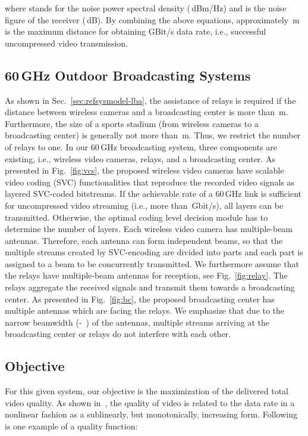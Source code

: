 \documentclass[conference]{IEEEtran}
\begin{document}
where  stands for the noise power spectral density (\,dBm/Hz) and  is the noise figure of the receiver (\,dB).
By combining the above equations, approximately \,m is the maximum distance for obtaining  GBit/s data rate, i.e., successful uncompressed video transmission.






\subsection{60\,GHz Outdoor Broadcasting Systems}\label{sec:refsysmodel-model}


As shown in Sec.~\ref{sec:refsysmodel-lba}, the assistance of relays is required if the distance between wireless cameras and a broadcasting center is more than \,m.
Furthermore, the size of a sports stadium (from wireless cameras to a broadcasting center) is generally not more than \,m. Thus, we restrict the number of relays to one.
In our 60\,GHz broadcasting system, three components are existing, i.e., wireless video cameras, relays, and a broadcasting center.
As presented in Fig.~\ref{fig:vcs}, the proposed wireless video cameras have scalable video coding (SVC) functionalities that reproduce the recorded video signals as layered SVC-coded bitstreams.
If the achievable rate of a 60\,GHz link is sufficient for uncompressed video streaming (i.e., more than \,Gbit/s), all layers can be transmitted.
Otherwise, the optimal coding level decision module has to determine the number of layers.
Each wireless video camera has multiple-beam antennas.
Therefore, each antenna can form  independent beams, so that the multiple streams created by SVC-encoding are divided into  parts and each part is assigned to a beam to be concurrently transmitted.
We furthermore assume that the relays have multiple-beam antennas for reception, see
Fig.~\ref{fig:relay}. The relays aggregate the received signals and transmit them towards a broadcasting center. As presented in Fig.~\ref{fig:bc}, the proposed broadcasting center has multiple antennas which are facing the relays. We emphasize that due to the narrow beamwidth (-~\cite{comotech}) of the antennas, multiple streams arriving at the broadcasting center or relays do not interfere with each other.


\subsection{Objective}\label{sec:objective}
For this given system, our objective is the maximization of the delivered total video quality.
As shown in~\cite{kim12tbc}, the quality of video is related to the data rate in a nonlinear fashion as a sublinearly, but monotonically, increasing form.
Following is one example of a quality function:
\end{document}
